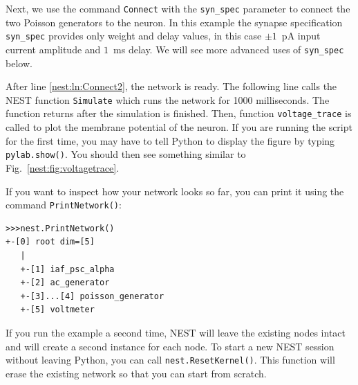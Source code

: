 \documentclass{article}
\begin{document}
Next, we use the command \lstinline!Connect! with the
\lstinline!syn_spec! parameter to connect the
two Poisson generators to the neuron. In this example the synapse
specification \lstinline!syn_spec! provides only weight and delay
values, in this case $\pm 1$~pA input current amplitude and $1$~ms
delay. We will see more advanced uses of  \lstinline!syn_spec! below.

After line \ref{nest:ln:Connect2}, the network is ready. The following
line calls the NEST function \lstinline!Simulate! which runs the
network for 1000 milliseconds. The function returns after the
simulation is finished. Then, function \lstinline!voltage_trace! is
called to plot the membrane potential of the neuron. If you are
running the script for the first time, you may have to tell Python to display
the figure by typing \lstinline!pylab.show()!. You should then see
something similar to Fig.~\ref{nest:fig:voltagetrace}.

If you want to inspect how your network looks so far, you can print
it using the command \lstinline!PrintNetwork()!:

\begin{lstlisting}[numbers=none]
>>>nest.PrintNetwork()
+-[0] root dim=[5]
   |
   +-[1] iaf_psc_alpha
   +-[2] ac_generator
   +-[3]...[4] poisson_generator
   +-[5] voltmeter
\end{lstlisting}

If you run the example a second time, NEST will leave the existing
nodes intact and will create a second instance for each node. To start
a new NEST session without leaving Python, you can call
\lstinline!nest.ResetKernel()!. This function will erase the existing
network so that you can start from scratch.
\end{document}
